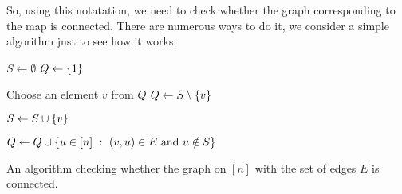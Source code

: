 So, using this notatation, we need to check whether the graph corresponding to
the map is connected.
There are numerous ways to do it, we consider a simple algorithm just to see how
it works.
\begin{algorithm}
  \begin{algorithmic}[1]
      \State $S \gets \emptyset$
      \State $Q \gets \set{1}$

      \label{algorithm:connectivity-cycle}
        \State Choose an element $v$ from $Q$
        \State $Q \gets S \setminus \set{v}$

        \State $S \gets S \cup \set{v}$

        \State $Q \gets Q \cup
          \set[{(v, u) \in E \text{ and } u \notin S}]{u \in [n]}$
      \EndWhile
      \label{line:connectivity-last}
      \State {}
    \EndFunction
  \end{algorithmic}
  \caption{An algorithm checking whether the graph on $[n]$ with the set of
  edges $E$ is connected.}
  \label{algorithm:connectivity}
\end{algorithm}

